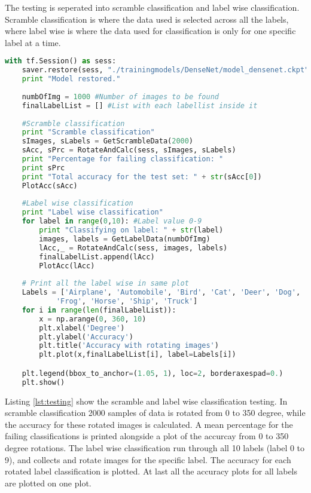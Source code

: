 The testing is seperated into scramble classification and label wise classification. Scramble classification is where the data used is selected across all the labels, where label wise is where the data used for classification is only for one specific label at a time.

\begin{lstlisting}[language=Python, label=lst:testing, caption=Testing the classification abilities for the model]
with tf.Session() as sess:
    saver.restore(sess, "./trainingmodels/DenseNet/model_densenet.ckpt")
    print "Model restored."
    
    numbOfImg = 1000 #Number of images to be found
    finalLabelList = [] #List with each labellist inside it
    
    #Scramble classification
    print "Scramble classification"
    sImages, sLabels = GetScrambleData(2000)
    sAcc, sPrc = RotateAndCalc(sess, sImages, sLabels)
    print "Percentage for failing classification: "
    print sPrc
    print "Total accuracy for the test set: " + str(sAcc[0])
    PlotAcc(sAcc)
    
    #Label wise classification
    print "Label wise classification"
    for label in range(0,10): #Label value 0-9
        print "Classifying on label: " + str(label)
        images, labels = GetLabelData(numbOfImg)
        lAcc,_ = RotateAndCalc(sess, images, labels)
        finalLabelList.append(lAcc)
        PlotAcc(lAcc)
    
    # Print all the label wise in same plot
    Labels = ['Airplane', 'Automobile', 'Bird', 'Cat', 'Deer', 'Dog', 
    		'Frog', 'Horse', 'Ship', 'Truck']
    for i in range(len(finalLabelList)):
        x = np.arange(0, 360, 10)
        plt.xlabel('Degree')
        plt.ylabel('Accuracy')
        plt.title('Accuracy with rotating images')
        plt.plot(x,finalLabelList[i], label=Labels[i])

    plt.legend(bbox_to_anchor=(1.05, 1), loc=2, borderaxespad=0.)
    plt.show()
\end{lstlisting}

Listing \ref{lst:testing} show the scramble and label wise classification testing. In scramble classification 2000 samples of data is rotated from 0 to 350 degree, while the accuracy for these rotated images is calculated. A mean percentage for the failing classifications is printed alongside a plot of the accurcay from 0 to 350 degree rotations. The label wise classification run through all 10 labels (label 0 to 9), and collects and rotate images for the specific label. The accuracy for each rotated label classification is plotted. At last all the accuracy plots for all labels are plotted on one plot.

